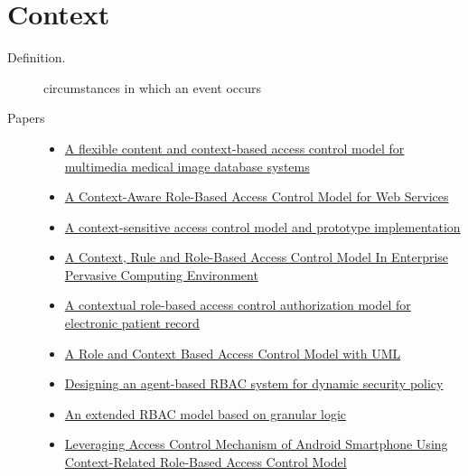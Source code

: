 \documentclass[letterpaper,10pt,english]{sphinxmanual}
\begin{document}
\chapter{Context}
\label{categories/context::doc}\label{categories/context:context}\begin{description}
\item[{Definition.}] \leavevmode
circumstances in which an event occurs

\item[{Papers}] \leavevmode\begin{itemize}
\item {} 
\href{http://dl.acm.org/citation.cfm?id=1232473}{A flexible content and context-based access control model for multimedia medical image database systems}

\item {} 
\href{http://ieeexplore.ieee.org/xpl/login.jsp?tp=\&arnumber=1552897\&url=http\%3A\%2F\%2Fieeexplore.ieee.org\%2Fxpls\%2Fabs\_all.jsp\%3Farnumber\%3D1552897}{A Context-Aware Role-Based Access Control Model for Web Services}

\item {} 
\href{http://citeseerx.ist.psu.edu/viewdoc/download?doi=10.1.1.102.9126\&rep=rep1\&type=pdf}{A context-sensitive access control model and prototype implementation}

\item {} 
\href{http://ieeexplore.ieee.org/xpls/abs\_all.jsp?arnumber=4079196}{A Context, Rule and Role-Based Access Control Model In Enterprise Pervasive Computing Environment}

\item {} 
\href{http://ieeexplore.ieee.org/xpls/abs\_all.jsp?arnumber=1229859}{A contextual role-based access control authorization model for electronic patient record}

\item {} 
\href{http://ieeexplore.ieee.org/xpls/abs\_all.jsp?arnumber=4709140}{A Role and Context Based Access Control Model with UML}

\item {} 
\href{http://ieeexplore.ieee.org/xpls/abs\_all.jsp?arnumber=1376833}{Designing an agent-based RBAC system for dynamic security policy}

\item {} 
\href{http://ieeexplore.ieee.org/xpls/abs\_all.jsp?arnumber=4664701}{An extended RBAC model based on granular logic}

\item {} 
\href{http://ieeexplore.ieee.org.prox.lib.ncsu.edu/xpl/articleDetails.jsp?tp=\&arnumber=5967517\&contentType=Conference+Publications\&searchField\%3DSearch\_All\%26queryText\%3Dleveraging+access+control+mechanism+of+android+smartphone+using+context-related+role-based+access+control+model}{Leveraging Access Control Mechanism of Android Smartphone Using Context-Related Role-Based Access Control Model}


\end{itemize}
\end{description}
\end{document}
